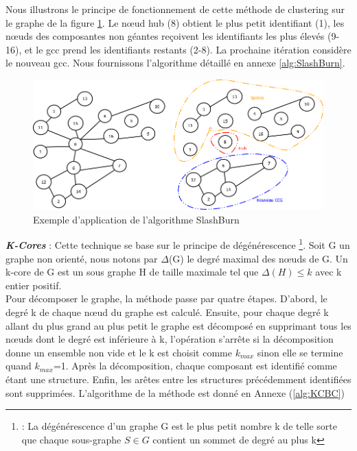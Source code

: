 \documentclass[a4paper,oneside,12pt]{report}
\theoremstyle{definition}
\begin{document}
\begin{enumerate}
Nous illustrons le principe de fonctionnement de cette méthode de clustering sur le graphe de la figure \ref{Img:slashb}. Le nœud hub (8) obtient le plus petit identifiant (1), les nœuds des composantes  non géantes reçoivent les identifiants les plus élevés (9-16), et le \gls{gcc} prend les identifiants restants (2-8). La prochaine itération considère le nouveau \gls{gcc}. Nous fournissons l'algorithme détaillé en annexe \ref{alg:SlashBurn}.

\begin{figure}[H]
	\centering
	
	\includegraphics[scale=0.25]{ressources/image/slashburn.png}
	\caption{Exemple d'application de l'algorithme SlashBurn}
	\label{Img:slashb}
 \end{figure}

\textbf{\textit{K-Cores}} : Cette technique se base sur le principe de dégénérescence \footnote{: La dégénérescence d’un graphe G est le plus petit nombre k de
 telle sorte que chaque sous-graphe $S \in G$ contient un sommet de degré au plus k}. Soit G un graphe non orienté, nous notons par $\Delta$(G) le degré maximal des nœuds de G. Un k-core de G est un sous graphe H de taille maximale tel que $\Delta(H) \le k$ avec k entier positif.\\
Pour décomposer le graphe, la méthode passe par quatre étapes. D'abord, le degré k de chaque nœud du graphe est calculé. Ensuite, pour chaque degré k allant du plus grand au plus petit le graphe est décomposé en supprimant tous les nœuds dont le degré est inférieure à k, l'opération s'arrête si la décomposition donne un ensemble non vide et le k est choisit comme $k_{max}$ sinon elle se termine quand $k_{max}$=1. Après la décomposition, chaque composant est identifié comme étant une structure. Enfin, les arêtes entre les structures précédemment identifiées sont supprimées. L'algorithme de la méthode est donné en Annexe (\ref{alg:KCBC})\\



\end{enumerate}
\end{document}
